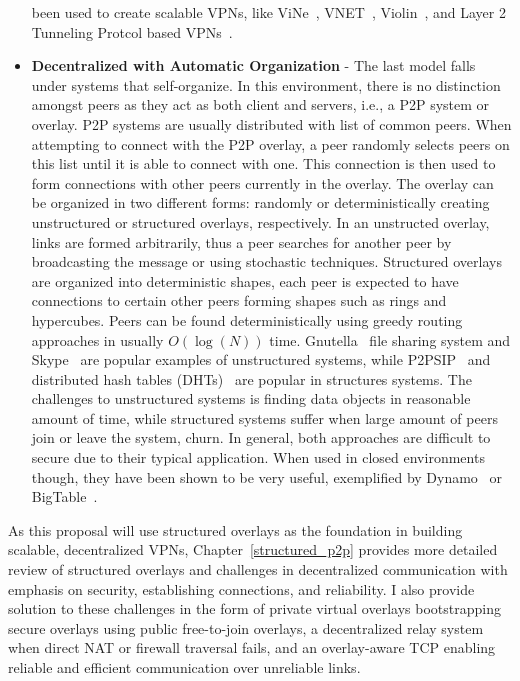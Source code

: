 \begin{itemize}
been used to create scalable VPNs, like ViNe~\cite{vine}, VNET~\cite{vnet},
Violin~\cite{violin}, and Layer 2 Tunneling Protcol based VPNs~\cite{l2tp}.
\item \textbf{Decentralized with Automatic Organization} - The last model falls
under systems that self-organize.  In this environment, there is no distinction
amongst peers as they act as both client and servers, i.e., a P2P system or
overlay.  P2P systems are usually distributed with list of common peers.  When
attempting to connect with the P2P overlay, a peer randomly selects peers on
this list until it is able to connect with one.  This connection is then used
to form connections with other peers currently in the overlay.  The overlay
can be organized in two different forms: randomly or deterministically
creating unstructured or structured overlays, respectively.  In an unstructed
overlay, links are formed arbitrarily, thus a peer searches for another peer
by broadcasting the message or using stochastic techniques.  Structured
overlays are organized into deterministic shapes, each peer is expected to
have connections to certain other peers forming shapes such as rings and
hypercubes.  Peers can be found deterministically using greedy routing
approaches in usually $O(\log(N))$ time.  Gnutella~\cite{gnutella} file sharing
system and Skype~\cite{skype} are popular examples of unstructured systems,
while P2PSIP~\cite{p2psip} and distributed hash tables (DHTs)~\cite{chord} are
popular in structures systems.  The challenges to unstructured systems is
finding data objects in reasonable amount of time, while structured systems
suffer when large amount of peers join or leave the system, churn.  In general,
both approaches are difficult to secure due to their typical application.
When used in closed environments though, they have been shown to be very
useful, exemplified by Dynamo~\cite{dynamo} or BigTable~\cite{bigtable}.
\end{itemize}
As this proposal will use structured overlays as the foundation in building
scalable, decentralized VPNs, Chapter~\ref{structured_p2p} provides more
detailed review of structured overlays and challenges in decentralized
communication with emphasis on security, establishing connections, and
reliability.  I also provide solution to these challenges in the form of
private virtual overlays bootstrapping secure overlays using public
free-to-join overlays, a decentralized relay system when direct NAT or firewall
traversal fails, and an overlay-aware TCP enabling reliable and efficient
communication over unreliable links.

